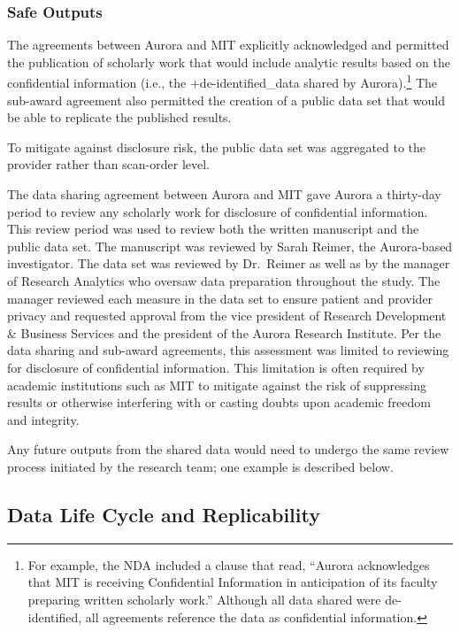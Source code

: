 \documentclass[
]{WileySix}
\begin{document}
\hypertarget{safe-outputs-4}{%
\subsubsection{Safe Outputs}\label{safe-outputs-4}}

The agreements between Aurora and MIT explicitly acknowledged and permitted the publication of scholarly work that would include analytic results based on the confidential information (i.e., the +de-identified\_data\textbar{} shared by Aurora).\footnote{For example, the NDA included a clause that read, ``Aurora acknowledges that MIT is receiving Confidential Information in anticipation of its faculty preparing written scholarly work.'' Although all data shared were de-identified, all agreements reference the data as confidential information.} The sub-award agreement also permitted the creation of a public data set that would be able to replicate the published results.

To mitigate against disclosure risk, the public data set was aggregated to the provider rather than scan-order level.

The data sharing agreement between Aurora and MIT gave Aurora a thirty-day period to review any scholarly work for disclosure of confidential information. This review period was used to review both the written manuscript and the public data set. The manuscript was reviewed by Sarah Reimer, the Aurora-based investigator. The data set was reviewed by Dr.~Reimer as well as by the manager of Research Analytics who oversaw data preparation throughout the study. The manager reviewed each measure in the data set to ensure patient and provider privacy and requested approval from the vice president of Research Development \& Business Services and the president of the Aurora Research Institute. Per the data sharing and sub-award agreements, this assessment was limited to reviewing for disclosure of confidential information. This limitation is often required by academic institutions such as MIT to mitigate against the risk of suppressing results or otherwise interfering with or casting doubts upon academic freedom and integrity.

Any future outputs from the shared data would need to undergo the same review process initiated by the research team; one example is described below.

\hypertarget{data-life-cycle-and-replicability-3}{%
\subsection{Data Life Cycle and Replicability}\label{data-life-cycle-and-replicability-3}}
\end{document}
